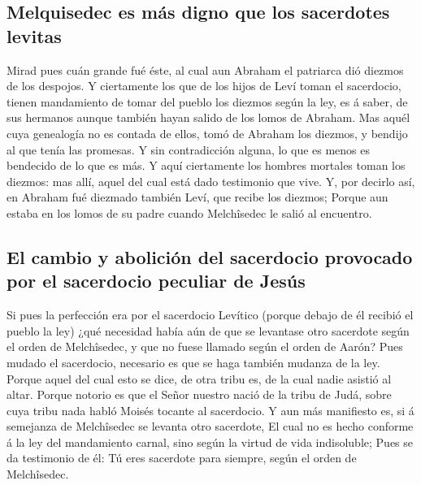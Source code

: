 \hypertarget{melquisedec-es-muxe1s-digno-que-los-sacerdotes-levitas}{%
\subsection{Melquisedec es más digno que los sacerdotes
levitas}\label{melquisedec-es-muxe1s-digno-que-los-sacerdotes-levitas}}

 Mirad pues cuán grande fué éste, al cual aun Abraham el
patriarca dió diezmos de los despojos.  Y ciertamente los
que de los hijos de Leví toman el sacerdocio, tienen mandamiento de
tomar del pueblo los diezmos según la ley, es á saber, de sus hermanos
aunque también hayan salido de los lomos de Abraham.  Mas
aquél cuya genealogía no es contada de ellos, tomó de Abraham los
diezmos, y bendijo al que tenía las promesas.  Y sin
contradicción alguna, lo que es menos es bendecido de lo que es más.
 Y aquí ciertamente los hombres mortales toman los diezmos:
mas allí, aquel del cual está dado testimonio que vive.  Y,
por decirlo así, en Abraham fué diezmado también Leví, que recibe los
diezmos;  Porque aun estaba en los lomos de su padre cuando
Melchîsedec le salió al encuentro.

\hypertarget{el-cambio-y-aboliciuxf3n-del-sacerdocio-provocado-por-el-sacerdocio-peculiar-de-jesuxfas}{%
\subsection{El cambio y abolición del sacerdocio provocado por el
sacerdocio peculiar de
Jesús}\label{el-cambio-y-aboliciuxf3n-del-sacerdocio-provocado-por-el-sacerdocio-peculiar-de-jesuxfas}}

 Si pues la perfección era por el sacerdocio Levítico
(porque debajo de él recibió el pueblo la ley) ¿qué necesidad había aún
de que se levantase otro sacerdote según el orden de Melchîsedec, y que
no fuese llamado según el orden de Aarón?  Pues mudado el
sacerdocio, necesario es que se haga también mudanza de la ley.
 Porque aquel del cual esto se dice, de otra tribu es, de
la cual nadie asistió al altar.  Porque notorio es que el
Señor nuestro nació de la tribu de Judá, sobre cuya tribu nada habló
Moisés tocante al sacerdocio.  Y aun más manifiesto es, si
á semejanza de Melchîsedec se levanta otro sacerdote,  El
cual no es hecho conforme á la ley del mandamiento carnal, sino según la
virtud de vida indisoluble;  Pues se da testimonio de él:
Tú eres sacerdote para siempre, según el orden de Melchîsedec.

